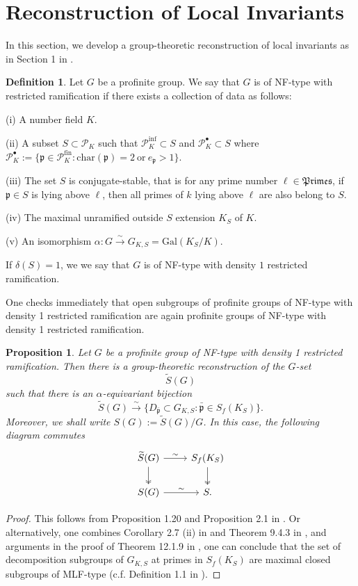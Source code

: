 \documentclass{article}
\theoremstyle{plain}
\newtheorem{prop}[thm]{Proposition}
\theoremstyle{definition}
\newtheorem{defn}[thm]{Definition}
\theoremstyle{remark}
\begin{document}
\section{Reconstruction of Local Invariants}
In this section, we develop a group-theoretic reconstruction of local invariants as in Section 1 in \cite{Ho1}. 
\begin{defn}
Let $G$ be a profinite group. We say that $G$ is of NF-type with restricted ramification if there exists a collection of data as follows: \par 
(i) A number field $K$. \par
(ii) A subset $S \subset \mathscr{P}_K$ such that $\mathscr{P}_K^{\text{inf}} \subset S$ and $\mathscr{P}_K^{\bullet} \subset S$ where $\mathscr{P}_K^{\bullet} := \{\mathfrak{p} \in \mathscr{P}_K^{\text{fin}}:\text{char}(\mathfrak{p} )=2~\text{or}~e_{\mathfrak{p}} > 1\}$. \par
(iii) The set $S$ is conjugate-stable, that is for any prime number $\ell \in \mathfrak{Primes}$, if $\mathfrak{p} \in S$ is lying above $\ell$, then all primes of $k$ lying above $\ell$ are also belong to $S$. \par 
(iv) The maximal unramified outside $S$ extension $K_S$ of $K$. \par
(v) An isomorphism $\alpha:G \xrightarrow{\sim}G_{K,S} = \text{Gal}(K_S/K)$. \par 
If $\delta(S) = 1$, we we say that $G$ is of NF-type with density $1$ restricted ramification.
\end{defn}
One checks immediately that open subgroups of profinite groups of NF-type with density 1 restricted ramification are again profinite groups of NF-type with density 1 restricted ramification.
\begin{prop}
Let $G$ be a profinite group of NF-type with density 1 restricted ramification. Then there is a group-theoretic reconstruction of the $G$-set
$$
\widetilde{S}(G)
$$
such that there is an $\alpha$-equivariant bijection
$$
\widetilde{S}(G) \xrightarrow{\sim} \{D_{\bar{\mathfrak{p}}} \subset G_{K,S}: \bar{\mathfrak{p}} \in S_f(K_S)\}.
$$
Moreover, we shall write $S(G) := \widetilde{S}(G)/G$. In this case, the following diagram commutes
$$
\begin{tikzcd}
\widetilde{S}(G) \arrow[r,"\sim"] \arrow[d,twoheadrightarrow] & S_f(K_S) \arrow[d,twoheadrightarrow] \\
S(G) \arrow[r,"\sim"] & S.
\end{tikzcd}
$$
\end{prop}
\begin{proof}
This follows from Proposition 1.20 and Proposition 2.1 in \cite{Shi1}. Or alternatively, one combines Corollary 2.7 (ii) in \cite{Ivanov} and Theorem 9.4.3 in \cite{NSW}, and arguments in the proof of Theorem 12.1.9 in \cite{NSW}, one can conclude that the set of decomposition subgroups of $G_{K,S}$ at primes in $S_f(K_S)$ are maximal closed subgroups of MLF-type (c.f. Definition 1.1 in \cite{Ho1}).

\end{proof}
\end{document}
